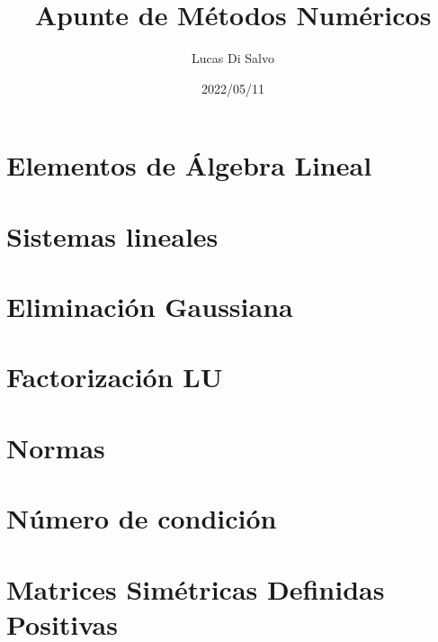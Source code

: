 \documentclass[a4paper]{article}
\title{Apunte de Métodos Numéricos}
\author{Lucas Di Salvo}
\date{2022/05/11}
\begin{document}
\maketitle

\thispagestyle{empty}
\vspace{1cm}
{
\hypersetup{linkcolor = black}
\tableofcontents
}
\newpage

\thispagestyle{empty}
\vspace{1cm}
\renewcommand*\listalgorithmname{Lista de Algoritmos}
{
\hypersetup{linkcolor = black}
\listofalgorithms
}
\newpage

\section{Elementos de Álgebra Lineal}
\label{section:elementos_de_algebra_lineal}

\newpage

\section{Sistemas lineales}
\label{section:sistemas_lineales}

\newpage

\section{Eliminación Gaussiana}
\label{section:eliminacion_gaussiana}

\newpage

\section{Factorización LU}
\label{section:factorizacion_lu}

\newpage

\section{Normas}
\label{section:normas}

\newpage

\section{Número de condición}
\label{section:numero_de_condicion}

\newpage

\section{Matrices Simétricas Definidas Positivas}
\label{section:matrices_sdp}

\newpage
\end{document}
